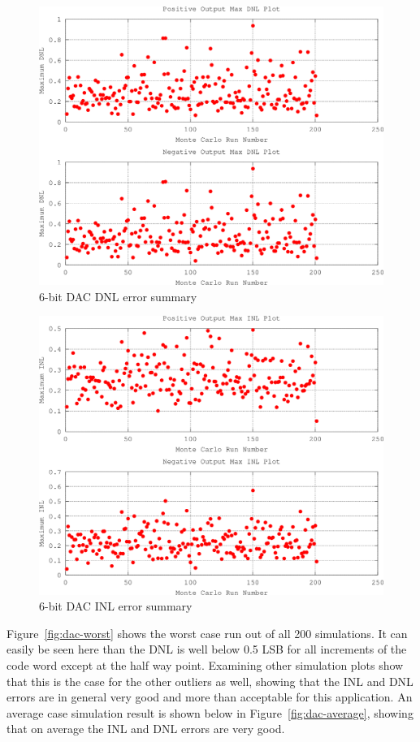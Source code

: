 \documentclass[12pt,oneside,final]{siuethesis}
\theoremstyle{definition}
\begin{document}
\begin{figure}[htbp!]
 \centering
 \includegraphics[scale=.31]{./ch4_figures/dnl_summary.png}
 \caption{6-bit DAC DNL error summary}
 \label{fig:dnl}
\end{figure} 

\begin{figure}[htbp!]
 \centering
 \includegraphics[scale=.31]{./ch4_figures/inl_summary.png}
 \caption{6-bit DAC INL error summary}
 \label{fig:inl}
\end{figure} 

\par Figure~\ref{fig:dac-worst} shows the worst case run out of all 200 simulations. It can easily be seen here than the DNL is well below 0.5 LSB for all increments of the code word except at the half way point. Examining other simulation plots show that this is the case for the other outliers as well, showing that the INL and DNL errors are in general very good and more than acceptable for this application. An average case simulation result is shown below in Figure~\ref{fig:dac-average}, showing that on average the INL and DNL errors are very good.
\end{document}
